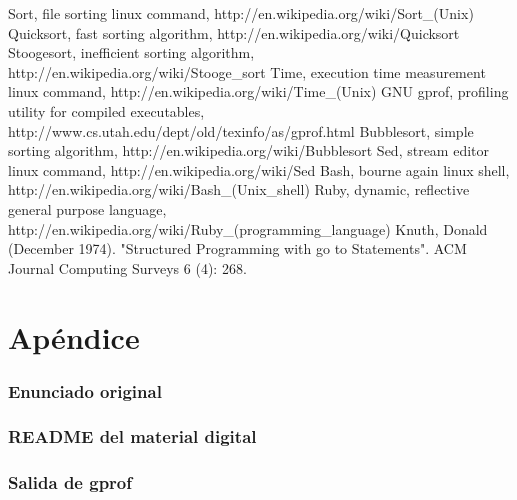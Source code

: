 \documentclass[a4paper,11pt]{article}
\begin{document}
\begin{thebibliography}{99}

 Sort, file sorting linux command, http://en.wikipedia.org/wiki/Sort\_(Unix)
 Quicksort, fast sorting algorithm, http://en.wikipedia.org/wiki/Quicksort
 Stoogesort, inefficient sorting algorithm, http://en.wikipedia.org/wiki/Stooge\_sort
 Time, execution time measurement linux command, http://en.wikipedia.org/wiki/Time\_(Unix)
 GNU gprof, profiling utility for compiled executables, http://www.cs.utah.edu/dept/old/texinfo/as/gprof.html
 Bubblesort, simple sorting algorithm, http://en.wikipedia.org/wiki/Bubblesort
 Sed, stream editor linux command, http://en.wikipedia.org/wiki/Sed
 Bash, bourne again linux shell, http://en.wikipedia.org/wiki/Bash\_(Unix\_shell)
 Ruby, dynamic, reflective general purpose language, http://en.wikipedia.org/wiki/Ruby\_(programming\_language)
 Knuth, Donald (December 1974). "Structured Programming with go to Statements". ACM Journal Computing Surveys 6 (4): 268.

\end{thebibliography}

\clearpage

\part{Apéndice}
\appendix

\section{Enunciado original}\label{sec:enunciado}


\clearpage
\section{README del material digital}\label{sec:readme}


\clearpage
\section{Salida de gprof}\label{sec:gprof}
\clearpage
\lstset{
  basicstyle=\footnotesize,
  showspaces=false,
  showstringspaces=false,
  breaklines=true,
  frame=single
}


\end{document}
